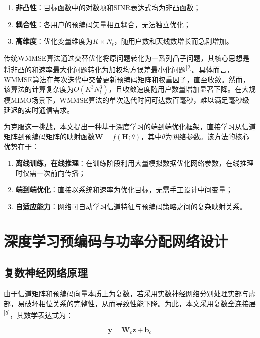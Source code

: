 \documentclass[twoside, 10pt]{ctexart}
\newcommand{\upcite}[1]{\textsuperscript{[#1]}}\newcommand{\normalcite}[1]{[#1]}
\begin{document}
\begin{enumerate}[label=\arabic*), topsep=0pt, partopsep=0pt, itemsep=-5pt]
    \item \textbf{非凸性}：目标函数中的对数项和SINR表达式均为非凸函数；
    \item \textbf{耦合性}：各用户的预编码矢量相互耦合，无法独立优化；
    \item \textbf{高维度}：优化变量维度为$K \times N_t$，随用户数和天线数增长而急剧增加。
\end{enumerate}

传统WMMSE算法通过交替优化将原问题转化为一系列凸子问题，其核心思想是将非凸的和速率最大化问题转化为加权均方误差最小化问题\upcite{2}。具体而言，WMMSE算法在每次迭代中交替更新预编码矩阵和权重因子，直至收敛。然而，该算法的计算复杂度为$O(K^3 N_t^3)$，且收敛速度随用户数量增加显著下降。在大规模MIMO场景下，WMMSE算法的单次迭代时间可达数百毫秒，难以满足毫秒级延迟的实时通信需求。

为克服这一挑战，本文提出一种基于深度学习的端到端优化框架，直接学习从信道矩阵到预编码矩阵的映射函数$\mathbf{W} = f(\mathbf{H}; \theta)$，其中$\theta$为网络参数。该方法的核心优势在于：

\begin{enumerate}[label=\arabic*), topsep=0pt, partopsep=0pt, itemsep=-5pt]
    \item \textbf{离线训练，在线推理}：在训练阶段利用大量模拟数据优化网络参数，在线推理时仅需一次前向传播；
    \item \textbf{端到端优化}：直接以系统和速率为优化目标，无需手工设计中间变量；
    \item \textbf{自适应能力}：网络可自动学习信道特征与预编码策略之间的复杂映射关系。
\end{enumerate}


\section{深度学习预编码与功率分配网络设计}

\subsection{复数神经网络原理}

由于信道矩阵和预编码向量本质上为复数，若采用实数神经网络分别处理实部与虚部，易破坏相位关系的完整性，从而导致性能下降。为此，本文采用复数全连接层\upcite{5}，其数学表达式为：\vspace{-2em}

\begin{equation}
\mathbf{y} = \mathbf{W}_c \mathbf{z} + \mathbf{b}_c
\end{equation}
\end{document}
